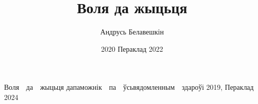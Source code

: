 \documentclass[letterpaper,10pt,openany,twocolumn]{memoir}
\author{Андрусь Белавешкін}
\title{Воля да жыцьця}
\date{2020 Пераклад 2022}
\begin{document}
%

\begin{titlingpage}
      {Воля\ \ да\ \ жыцьця}
      {дапаможнік\ \ па\ \ ўсьвядомленным\ \ здароўі}
      {2019, Пераклад 2024}

\end{titlingpage}

\pagestyle{headings}
\setcounter{page}{3}
\setcounter{tocdepth}{1}
\tableofcontents*
\clearpage

















\end{document}

